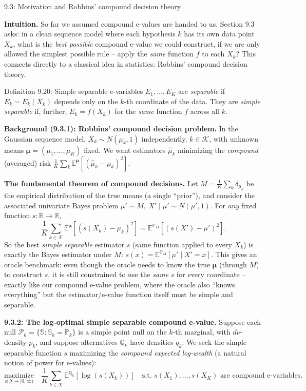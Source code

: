 \documentclass[aspectratio=169,10pt]{beamer}
\newcommand{\Kc}{\mathcal{K}}
\begin{document}
\begin{frame}[allowframebreaks]{9.3: Motivation and Robbins' compound decision theory}

\textbf{Intuition.} So far we assumed compound e-values are handed to us. Section 9.3 asks: in a clean sequence model where each hypothesis $k$ has its own data point $X_k$, what is the \emph{best possible} compound e-value we could construct, if we are only allowed the simplest possible rule -- apply the \emph{same} function $f$ to each $X_k$? This connects directly to a classical idea in statistics: Robbins' compound decision theory.

\begin{block}{Definition 9.20: Simple separable e-variables}
$E_1,\dots,E_K$ are \emph{separable} if $E_k = E_k(X_k)$ depends only on the $k$-th coordinate of the data. They are \emph{simple separable} if, further, $E_k = f(X_k)$ for the \emph{same} function $f$ across all $k$.
\end{block}

\textbf{Background (9.3.1): Robbins' compound decision problem.} In the Gaussian sequence model, $X_k \sim N(\mu_k,1)$ independently, $k\in\Kc$, with unknown means $\boldsymbol\mu=(\mu_1,\dots,\mu_K)$ fixed. We want estimators $\hat\mu_k$ minimizing the \emph{compound} (averaged) risk $\frac{1}{K}\sum_k \mathbb{E}^{\boldsymbol\mu}[(\hat\mu_k-\mu_k)^2]$.

\framebreak

\textbf{The fundamental theorem of compound decisions.} Let $M = \frac{1}{K}\sum_k \delta_{\mu_k}$ be the empirical distribution of the true means (a single ``prior''), and consider the associated univariate Bayes problem $\mu'\sim M,\ X'\mid\mu' \sim N(\mu',1)$. For \emph{any} fixed function $s:\mathbb{R}\to\mathbb{R}$,
\[
\frac{1}{K}\sum_{k\in\Kc}\mathbb{E}^{\boldsymbol\mu}[(s(X_k)-\mu_k)^2] = \mathbb{E}^{\mathbb{P}_M}[(s(X')-\mu')^2].
\]
So the best \emph{simple separable} estimator $s$ (same function applied to every $X_k$) is exactly the Bayes estimator under $M$: $s(x) = \mathbb{E}^{\mathbb{P}_M}[\mu' \mid X'=x]$. This gives an oracle benchmark: even though the oracle needs to know the true $\boldsymbol\mu$ (through $M$) to construct $s$, it is still constrained to use the \emph{same} $s$ for every coordinate -- exactly like our compound e-value problem, where the oracle also ``knows everything'' but the estimator/e-value function itself must be simple and separable.

\framebreak

\textbf{9.3.2: The log-optimal simple separable compound e-value.} Suppose each null $\mathcal{P}_k=\{\mathbb{S} : \mathbb{S}_k=\mathbb{P}_k\}$ is a simple point null on the $k$-th marginal, with $d\nu$-density $p_k$, and suppose alternatives $\mathbb{Q}_k$ have densities $q_k$. We seek the simple separable function $s$ maximizing the \emph{compound expected log-wealth} (a natural notion of power for e-values):
\[
\underset{s:\mathcal{Y}\to[0,\infty)}{\text{maximize}} \quad \frac{1}{K}\sum_{k\in\Kc} \mathbb{E}^{\mathbb{Q}_k}[\log(s(X_k))] \quad \text{s.t. } s(X_1),\dots,s(X_K) \text{ are compound e-variables.} \tag{9.8}
\]


\end{frame}
\end{document}
